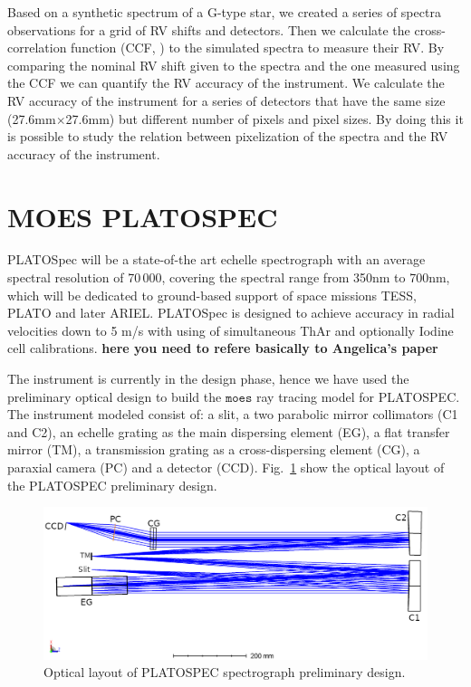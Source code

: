 \documentclass{article}
\begin{document}
Based on a synthetic spectrum of a G-type star, we created a series of spectra observations for a grid of RV shifts and detectors. Then we calculate the cross-correlation function (CCF, \cite{Queloz95}) to the simulated spectra to measure their RV. By comparing the nominal RV shift given to the spectra and the one measured using the CCF we can quantify the RV accuracy of the instrument. We calculate the RV accuracy of the instrument for a series of detectors that have the same size (27.6mm$\times$27.6mm) but different number of pixels and pixel sizes. By doing this it is possible to study the relation between pixelization of the spectra and the RV accuracy of the instrument.

\section{MOES PLATOSPEC}
PLATOSpec will be a state-of-the art echelle spectrograph with an average spectral resolution of 70\,000, covering the spectral range from 350nm to 700nm, which will be dedicated to ground-based support of space missions TESS, PLATO and later ARIEL. PLATOSpec is designed to achieve accuracy in radial velocities down to 5 m/s with using of simultaneous ThAr and optionally Iodine cell calibrations. {\bf here you need to refere basically to Angelica's paper}

The instrument is currently in the design phase, hence we have used the preliminary optical design to build the $\texttt{moes}$ ray tracing model for PLATOSPEC. The instrument modeled consist of: a slit, a two parabolic mirror collimators (C1 and C2), an echelle grating as the main dispersing element (EG), a flat transfer mirror (TM), a transmission grating as a cross-dispersing element (CG), a paraxial camera (PC) and a detector (CCD). Fig.~\ref{fig:ol} show the optical layout of the PLATOSPEC preliminary design.

\begin{figure}[h!]
    \centering
    \includegraphics[width=\textwidth]{platospec_pre.png}
    \caption{Optical layout of PLATOSPEC spectrograph preliminary design.}
    \label{fig:ol}
\end{figure}
\end{document}
